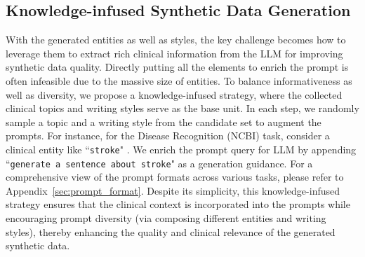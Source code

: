 \vspace{-0.5ex}
\subsection{Knowledge-infused Synthetic Data Generation}
\vspace{-0.5ex}
With the generated entities as well as styles, the key challenge becomes how to leverage them to extract rich clinical information from the LLM for improving synthetic data quality.
Directly putting all the elements to enrich the prompt is often infeasible due to the massive size of entities.
To balance informativeness as well as diversity, we propose a  knowledge-infused strategy, where the collected clinical topics and writing styles serve as the base unit. 
In each step, we randomly sample a topic and a writing style from the candidate set to augment the prompts.
For instance, for the Disease Recognition (NCBI) task, consider a clinical entity like ``\texttt{stroke}" . We enrich the prompt query for LLM by appending ``\texttt{generate a sentence about stroke}" as a generation guidance. For a comprehensive view of the prompt formats across various tasks, please refer to Appendix~\ref{sec:prompt_format}. 
Despite its simplicity, this knowledge-infused strategy ensures that the clinical context is incorporated into the prompts while encouraging prompt diversity (via composing different entities and writing styles), 
thereby enhancing the quality and clinical relevance of the generated synthetic data.


